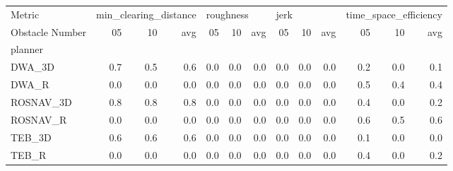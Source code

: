 \begin{tabular}{lrrrrrrrrrrrr}
\toprule
Metric & \multicolumn{3}{l}{min\_clearing\_distance} & \multicolumn{3}{l}{roughness} & \multicolumn{3}{l}{jerk} & \multicolumn{3}{l}{time\_space\_efficiency} \\
Obstacle Number &                    05 &   10 &  avg &        05 &   10 &  avg &   05 &   10 &  avg &                    05 &   10 &  avg \\
planner   &                       &      &      &           &      &      &      &      &      &                       &      &      \\
\midrule
DWA\_3D    &                   0.7 &  0.5 &  0.6 &       0.0 &  0.0 &  0.0 &  0.0 &  0.0 &  0.0 &                   0.2 &  0.0 &  0.1 \\
DWA\_R     &                   0.0 &  0.0 &  0.0 &       0.0 &  0.0 &  0.0 &  0.0 &  0.0 &  0.0 &                   0.5 &  0.4 &  0.4 \\
ROSNAV\_3D &                   0.8 &  0.8 &  0.8 &       0.0 &  0.0 &  0.0 &  0.0 &  0.0 &  0.0 &                   0.4 &  0.0 &  0.2 \\
ROSNAV\_R  &                   0.0 &  0.0 &  0.0 &       0.0 &  0.0 &  0.0 &  0.0 &  0.0 &  0.0 &                   0.6 &  0.5 &  0.6 \\
TEB\_3D    &                   0.6 &  0.6 &  0.6 &       0.0 &  0.0 &  0.0 &  0.0 &  0.0 &  0.0 &                   0.1 &  0.0 &  0.0 \\
TEB\_R     &                   0.0 &  0.0 &  0.0 &       0.0 &  0.0 &  0.0 &  0.0 &  0.0 &  0.0 &                   0.4 &  0.0 &  0.2 \\
\bottomrule
\end{tabular}
